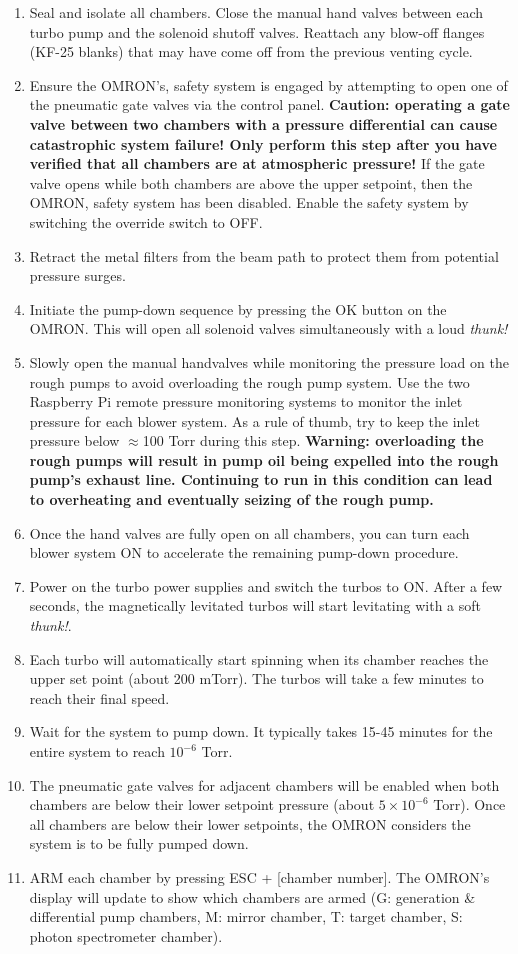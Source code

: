\begin{enumerate}
	\item Seal and isolate all chambers. Close the manual hand valves between each turbo pump and the solenoid shutoff valves. Reattach any blow-off flanges (KF-25 blanks) that may have come off from the previous venting cycle.
	\item Ensure the OMRON's, safety system is engaged by attempting to open one of the pneumatic gate valves via the control panel. \textbf{Caution: operating a gate valve between two chambers with a pressure differential can cause catastrophic system failure! Only perform this step after you have verified that all chambers are at atmospheric pressure!} If the gate valve opens while both chambers are above the upper setpoint, then the OMRON, safety system has been disabled. Enable the safety system by switching the override switch to OFF.
	\item Retract the metal filters from the beam path to protect them from potential pressure surges. 
	\item Initiate the pump-down sequence by pressing the OK button on the OMRON. This will open all solenoid valves simultaneously with a loud \textit{thunk!}
	\item Slowly open the manual handvalves while monitoring the pressure load on the rough pumps to avoid overloading the rough pump system. Use the two Raspberry Pi remote pressure monitoring systems to monitor the inlet pressure for each blower system. As a rule of thumb, try to keep the inlet pressure below $\approx$100 Torr during this step. \textbf{Warning: overloading the rough pumps will result in pump oil being expelled into the rough pump's exhaust line. Continuing to run in this condition can lead to overheating and eventually seizing of the rough pump.}
	\item Once the hand valves are fully open on all chambers, you can turn each blower system ON to accelerate the remaining pump-down procedure.
	\item Power on the turbo power supplies and switch the turbos to ON. After a few seconds, the magnetically levitated turbos will start levitating with a soft \textit{thunk!}.
	\item Each turbo will automatically start spinning when its chamber reaches the upper set point (about 200 mTorr). The turbos will take a few minutes to reach their final speed.
	\item Wait for the system to pump down. It typically takes 15-45 minutes for the entire system to reach $10^{-6}$ Torr.
	\item The pneumatic gate valves for adjacent chambers will be enabled when both chambers are below their lower setpoint pressure (about $5 \times 10^{-6}$ Torr). Once all chambers are below their lower setpoints, the OMRON considers the system is to be fully pumped down.
	\item ARM each chamber by pressing ESC + [chamber number]. The OMRON's display will update to show which chambers are armed (G: generation \& differential pump chambers, M: mirror chamber, T: target chamber, S: photon spectrometer chamber).
\end{enumerate}

